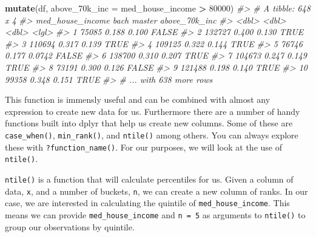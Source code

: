 \documentclass[
]{book}
\newenvironment{Shaded}{\begin{snugshade}}{\end{snugshade}}
\newcommand{\CommentTok}[1]{\textcolor[rgb]{0.56,0.35,0.01}{\textit{#1}}}
\newcommand{\DataTypeTok}[1]{\textcolor[rgb]{0.13,0.29,0.53}{#1}}
\newcommand{\DecValTok}[1]{\textcolor[rgb]{0.00,0.00,0.81}{#1}}
\newcommand{\KeywordTok}[1]{\textcolor[rgb]{0.13,0.29,0.53}{\textbf{#1}}}
\newcommand{\NormalTok}[1]{#1}
\newcommand{\OperatorTok}[1]{\textcolor[rgb]{0.81,0.36,0.00}{\textbf{#1}}}
\newcommand{\StringTok}[1]{\textcolor[rgb]{0.31,0.60,0.02}{#1}}
\begin{document}
\begin{Shaded}
\begin{Highlighting}[]
\KeywordTok{mutate}\NormalTok{(df, }\DataTypeTok{above\_70k\_inc =}\NormalTok{ med\_house\_income }\OperatorTok{\textgreater{}}\StringTok{ }\DecValTok{80000}\NormalTok{) }
\CommentTok{\#\textgreater{} \# A tibble: 648 x 4}
\CommentTok{\#\textgreater{}    med\_house\_income  bach master above\_70k\_inc}
\CommentTok{\#\textgreater{}               \textless{}dbl\textgreater{} \textless{}dbl\textgreater{}  \textless{}dbl\textgreater{} \textless{}lgl\textgreater{}        }
\CommentTok{\#\textgreater{}  1            75085 0.188 0.100  FALSE        }
\CommentTok{\#\textgreater{}  2           132727 0.400 0.130  TRUE         }
\CommentTok{\#\textgreater{}  3           110694 0.317 0.139  TRUE         }
\CommentTok{\#\textgreater{}  4           109125 0.322 0.144  TRUE         }
\CommentTok{\#\textgreater{}  5            76746 0.177 0.0742 FALSE        }
\CommentTok{\#\textgreater{}  6           138700 0.310 0.207  TRUE         }
\CommentTok{\#\textgreater{}  7           104673 0.247 0.149  TRUE         }
\CommentTok{\#\textgreater{}  8            73191 0.300 0.126  FALSE        }
\CommentTok{\#\textgreater{}  9           121488 0.198 0.140  TRUE         }
\CommentTok{\#\textgreater{} 10            99358 0.348 0.151  TRUE         }
\CommentTok{\#\textgreater{} \# ... with 638 more rows}
\end{Highlighting}
\end{Shaded}

This function is immensly useful and can be combined with almost any expression to create new data for us. Furthermore there are a number of handy functions built into dplyr that help us create new columns. Some of these are \texttt{case\_when()}, \texttt{min\_rank()}, and \texttt{ntile()} among others. You can always explore these with \texttt{?function\_name()}. For our purposes, we will look at the use of \texttt{ntile()}.

\texttt{ntile()} is a function that will calculate percentiles for us. Given a column of data, \texttt{x}, and a number of buckets, \texttt{n}, we can create a new column of ranks. In our case, we are interested in calculating the quintile of \texttt{med\_house\_income}. This means we can provide \texttt{med\_house\_income} and \texttt{n\ =\ 5} as arguments to \texttt{ntile()} to group our observations by quintile.
\end{document}
